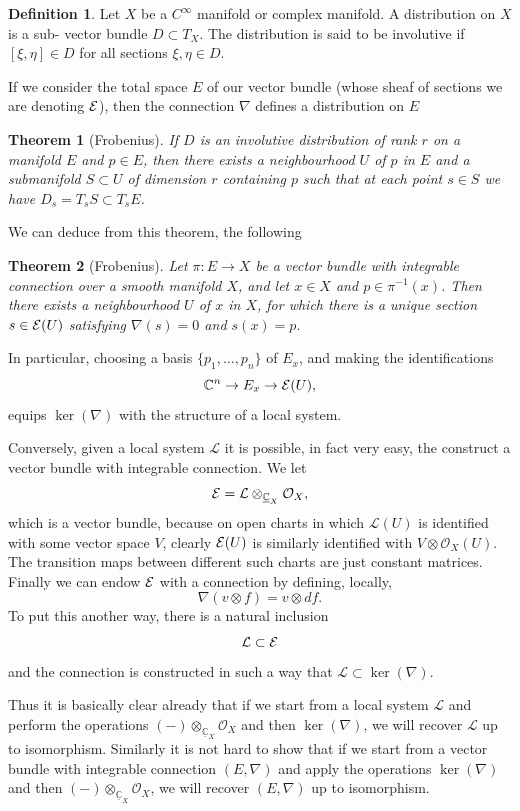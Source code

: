 \documentclass[12pt]{article}
\theoremstyle{plain}
\newtheorem{thm}{Theorem}[section]
\theoremstyle{definition}
\newtheorem{defn}{Definition}[section]
\numberwithin{equation}{section}
\newcommand{\C}{\mathbb{C}}
\newcommand{\CL}{\mathcal{L}}
\newcommand{\OO}{\mathcal{O}}
\begin{document}
\begin{defn}
Let $X$ be a $C^\infty$ manifold or complex manifold. A distribution on $X$ is a sub- vector bundle $D \subset T_X$. The distribution is said to be involutive if $[\xi, \eta] \in D$ for all sections $\xi, \eta \in D$.
\end{defn}
If we consider the total space $E$ of our vector bundle (whose sheaf of sections we are denoting $\mathcal{E}$), then the connection $\nabla$ defines a distribution on $E$


\begin{thm}[Frobenius]
If $D$ is an involutive distribution of rank $r$ on a manifold $E$ and $p \in E$, then there exists a neighbourhood $U$ of $p$ in $E$ and a submanifold $S \subset U$ of dimension $r$ containing $p$ such that at each point $s \in S$ we have $D_s = T_s S \subset T_sE$.
\end{thm}


We can deduce from this theorem, the following
\begin{thm}[Frobenius]
Let $\pi : E \rightarrow X$ be a vector bundle with integrable connection over a smooth manifold $X$, and let $x \in X$ and $p \in \pi^{-1}(x)$. Then there exists a neighbourhood $U$ of $x$ in $X$, for which there is a unique section $s \in \mathcal{E}(U)$ satisfying $\nabla(s) = 0$ and $s(x) = p$.
\end{thm}
In particular, choosing a basis $\{p_1, \ldots, p_n\}$ of $E_x$, and making the identifications
\[
\C^n \rightarrow E_x \rightarrow \E(U),
\]
equips $\ker(\nabla)$ with the structure of a local system.

Conversely, given a local system $\CL$ it is possible, in fact very easy, the construct a vector bundle with integrable connection. We let
\[
\E = \CL \otimes_{\underline{\C}_X} \OO_X,
\]
which is a vector bundle, because on open charts in which $\CL(U)$ is identified with some vector space $V$, clearly $\mathcal{E}(U)$ is similarly identified with $V \otimes \OO_X(U)$. The transition maps between different such charts are just constant matrices. Finally we can endow $\mathcal{E}$ with a connection by defining, locally,
\[
\nabla(v \otimes f) = v \otimes df.
\]
To put this another way, there is a natural inclusion
\[
\CL \subset \E
\]
and the connection is constructed in such a way that $\CL \subset \ker(\nabla)$.

Thus it is basically clear already that if we start from a local system $\CL$ and perform the operations $(-) \otimes_{\underline{\C}_X} \OO_X$ and then $\ker(\nabla)$, we will recover $\CL$ up to isomorphism. Similarly it is not hard to show that if we start from a vector bundle with integrable connection $(E, \nabla)$ and apply the operations $\ker(\nabla)$ and then $(-) \otimes_{\underline{\C}_X} \OO_X$, we will recover $(E, \nabla)$ up to isomorphism.
\end{document}
